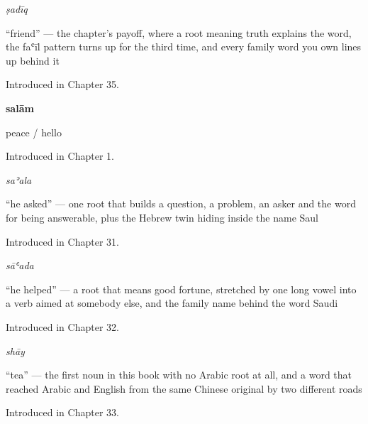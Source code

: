 \noindent\begin{minipage}[t]{\linewidth}
\raggedright
\textbf{}\enspace\emph{ṣadīq}\par
\small \textquotedblleft{}friend\textquotedblright{} — the chapter's payoff, where a root meaning truth explains the word, the faʿīl pattern turns up for the third time, and every family word you own lines up behind it\par
\footnotesize Introduced in Chapter 35.
\end{minipage}\par\medskip

\noindent\begin{minipage}[t]{\linewidth}
\raggedright
\textbf{salām}\par
\small peace / hello\par
\footnotesize Introduced in Chapter 1.
\end{minipage}\par\medskip

\noindent\begin{minipage}[t]{\linewidth}
\raggedright
\textbf{}\enspace\emph{saʾala}\par
\small \textquotedblleft{}he asked\textquotedblright{} — one root that builds a question, a problem, an asker and the word for being answerable, plus the Hebrew twin hiding inside the name Saul\par
\footnotesize Introduced in Chapter 31.
\end{minipage}\par\medskip

\noindent\begin{minipage}[t]{\linewidth}
\raggedright
\textbf{}\enspace\emph{sāʿada}\par
\small \textquotedblleft{}he helped\textquotedblright{} — a root that means good fortune, stretched by one long vowel into a verb aimed at somebody else, and the family name behind the word Saudi\par
\footnotesize Introduced in Chapter 32.
\end{minipage}\par\medskip

\noindent\begin{minipage}[t]{\linewidth}
\raggedright
\textbf{}\enspace\emph{shāy}\par
\small \textquotedblleft{}tea\textquotedblright{} — the first noun in this book with no Arabic root at all, and a word that reached Arabic and English from the same Chinese original by two different roads\par
\footnotesize Introduced in Chapter 33.
\end{minipage}\par\medskip

